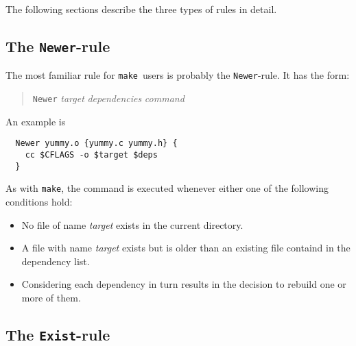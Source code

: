 \documentclass[12pt]{article}
\newcommand{\make}{\texttt{make}}
\begin{document}
The following sections describe the three types of rules in detail.

\subsection{The \texttt{Newer}-rule}
\label{secNewer}
The most familiar rule for \make\ users is probably the
\texttt{Newer}-rule. It has the form:
\begin{quote}
  \texttt{Newer} \textit{target} \textit{dependencies} \textit{command}
\end{quote}
An example is
\begin{verbatim}
  Newer yummy.o {yummy.c yummy.h} {
    cc $CFLAGS -o $target $deps
  }
\end{verbatim}
As with \make, the command is executed whenever either one of the
following conditions hold:
\begin{itemize}
\item No file of name \textit{target} exists in the current directory.
\item A file with name \textit{target} exists but is older than an
existing file containd in the dependency list.
\item Considering each dependency in turn results in the decision to
rebuild one or more of them.
\end{itemize}

\subsection{The \texttt{Exist}-rule}
\end{document}
